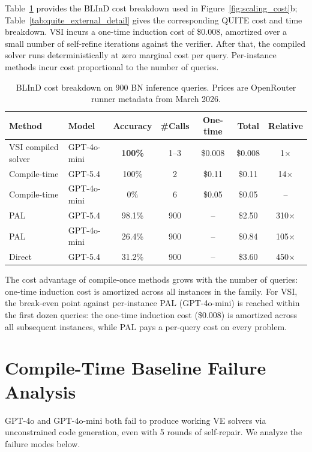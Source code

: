 \documentclass{article}
\begin{document}
Table~\ref{tab:cost_detail} provides the BLInD cost breakdown used in Figure~\ref{fig:scaling_cost}b; Table~\ref{tab:quite_external_detail} gives the corresponding QUITE cost and time breakdown.
VSI incurs a one-time induction cost of \$0.008, amortized over a small number of self-refine iterations against the verifier. After that, the compiled solver runs deterministically at zero marginal cost per query.
Per-instance methods incur cost proportional to the number of queries.

\begin{table}[ht]
\centering
\small
\caption{BLInD cost breakdown on 900 BN inference queries. Prices are OpenRouter runner metadata from March 2026.}
\label{tab:cost_detail}
\begin{tabular}{@{}llccccc@{}}
\toprule
Method & Model & Accuracy & \#Calls & One-time & Total & Relative \\
\midrule
VSI compiled solver & GPT-4o-mini & \textbf{100\%} & 1--3 & \$0.008 & \$0.008 & 1$\times$ \\
Compile-time & GPT-5.4 & 100\% & 2 & \$0.11 & \$0.11 & 14$\times$ \\
Compile-time & GPT-4o-mini & 0\% & 6 & \$0.05 & \$0.05 & -- \\
PAL & GPT-5.4 & 98.1\% & 900 & -- & \$2.50 & 310$\times$ \\
PAL & GPT-4o-mini & 26.4\% & 900 & -- & \$0.84 & 105$\times$ \\
Direct & GPT-5.4 & 31.2\% & 900 & -- & \$3.60 & 450$\times$ \\
\bottomrule
\end{tabular}
\end{table}

The cost advantage of compile-once methods grows with the number of queries: one-time induction cost is amortized across all instances in the family.
For VSI, the break-even point against per-instance PAL (GPT-4o-mini) is reached within the first dozen queries: the one-time induction cost (\$0.008) is amortized across all subsequent instances, while PAL pays a per-query cost on every problem.

\section{Compile-Time Baseline Failure Analysis}
\label{app:compile_failure}

GPT-4o and GPT-4o-mini both fail to produce working VE solvers via unconstrained code generation, even with 5 rounds of self-repair. We analyze the failure modes below.
\end{document}
